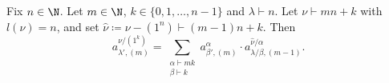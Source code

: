 \begin{theorem}\label{thm:14.6ii}
	Fix $n\in\N$. Let $m\in\N$, $k\in\{0,1,\dotsc,n-1\}$ and $\lambda\vdash n$. Let $\nu\vdash mn+k$ with $l(\nu)=n$, and set $\hat{\nu}\coloneqq \nu-(1^n)\vdash (m-1)n+k$. Then
	\[ a^{\nu/(1^k)}_{\lambda',(m)} = \sum_{\substack{\alpha\vdash mk\\\beta\vdash k}} a^\alpha_{\beta',(m)}\cdot a^{\hat{\nu}/\alpha}_{\lambda/\beta,(m-1)}. \]
\end{theorem}
